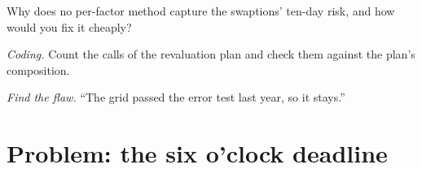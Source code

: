\begin{exercise}[$\star\star$]\label{exo:rc:build-a-risk-engine:6}
Why does no per-factor method capture the swaptions' ten-day risk, and how would you fix it cheaply?
\end{exercise}

\begin{exercise}[$\star\star\star$]\label{exo:rc:build-a-risk-engine:7}
\emph{Coding.} Count the calls of the revaluation plan and check them against the plan's composition.
\end{exercise}

\begin{exercise}[$\star\star\star$]\label{exo:rc:build-a-risk-engine:8}
\emph{Find the flaw.} ``The grid passed the error test last year, so it stays.''
\end{exercise}

\section{Problem: the six o'clock deadline}

